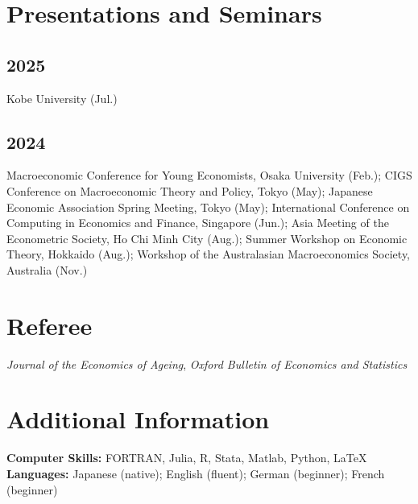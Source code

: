 \documentclass[11pt]{article}
\begin{document}
\section*{Presentations and Seminars}
\subsection*{2025}
Kobe University (Jul.)
\subsection*{2024}
Macroeconomic Conference for Young Economists, Osaka University (Feb.); 
CIGS Conference on Macroeconomic Theory and Policy, Tokyo (May); 
Japanese Economic Association Spring Meeting, Tokyo (May); 
International Conference on Computing in Economics and Finance, Singapore (Jun.); 
Asia Meeting of the Econometric Society, Ho Chi Minh City (Aug.); 
Summer Workshop on Economic Theory, Hokkaido (Aug.); 
Workshop of the Australasian Macroeconomics Society, Australia (Nov.)

\section*{Referee}
\textit{Journal of the Economics of Ageing}, \textit{Oxford Bulletin of Economics and Statistics}

\section*{Additional Information}
\textbf{Computer Skills:} FORTRAN, Julia, R, Stata, Matlab, Python, \LaTeX\newline
\textbf{Languages:} Japanese (native); English (fluent); German (beginner); French (beginner)
\end{document}
